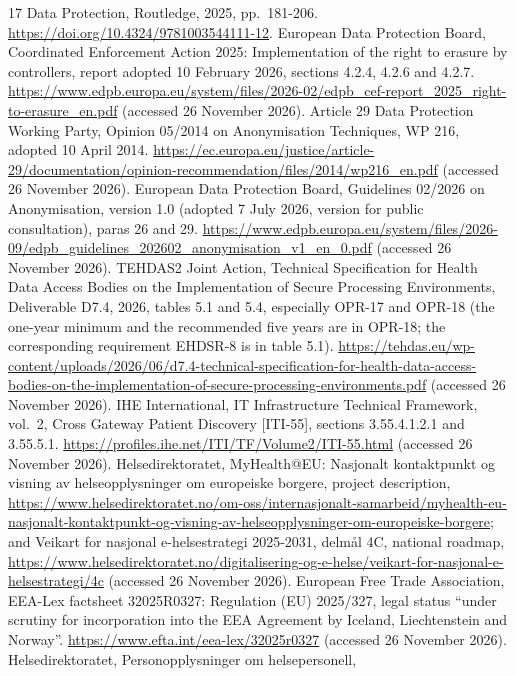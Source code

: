 \documentclass[5p,twocolumn]{elsarticle}
\begin{document}
\begin{thebibliography}{17}
Data Protection, Routledge, 2025, pp.~181-206.
\url{https://doi.org/10.4324/9781003544111-12}.
 European Data Protection Board, Coordinated Enforcement Action
2025: Implementation of the right to erasure by controllers, report
adopted 10 February 2026, sections 4.2.4, 4.2.6 and 4.2.7.
\url{https://www.edpb.europa.eu/system/files/2026-02/edpb_cef-report_2025_right-to-erasure_en.pdf}
(accessed 26 November 2026).
 Article 29 Data Protection Working Party, Opinion 05/2014 on
Anonymisation Techniques, WP 216, adopted 10 April 2014.
\url{https://ec.europa.eu/justice/article-29/documentation/opinion-recommendation/files/2014/wp216_en.pdf}
(accessed 26 November 2026).
 European Data Protection Board, Guidelines 02/2026 on
Anonymisation, version 1.0 (adopted 7 July 2026, version for public
consultation), paras 26 and 29.
\url{https://www.edpb.europa.eu/system/files/2026-09/edpb_guidelines_202602_anonymisation_v1_en_0.pdf}
(accessed 26 November 2026).
 TEHDAS2 Joint Action, Technical Specification for Health Data
Access Bodies on the Implementation of Secure Processing Environments,
Deliverable D7.4, 2026, tables 5.1 and 5.4, especially OPR-17 and OPR-18
(the one-year minimum and the recommended five years are in OPR-18; the
corresponding requirement EHDSR-8 is in table 5.1).
\url{https://tehdas.eu/wp-content/uploads/2026/06/d7.4-technical-specification-for-health-data-access-bodies-on-the-implementation-of-secure-processing-environments.pdf}
(accessed 26 November 2026).
 IHE International, IT Infrastructure Technical Framework,
vol.~2, Cross Gateway Patient Discovery {[}ITI-55{]}, sections
3.55.4.1.2.1 and 3.55.5.1.
\url{https://profiles.ihe.net/ITI/TF/Volume2/ITI-55.html} (accessed 26
November 2026).
 Helsedirektoratet, MyHealth@EU: Nasjonalt kontaktpunkt og
visning av helseopplysninger om europeiske borgere, project description,
\url{https://www.helsedirektoratet.no/om-oss/internasjonalt-samarbeid/myhealth-eu-nasjonalt-kontaktpunkt-og-visning-av-helseopplysninger-om-europeiske-borgere};
and Veikart for nasjonal e-helsestrategi 2025-2031, delmål 4C, national
roadmap,
\url{https://www.helsedirektoratet.no/digitalisering-og-e-helse/veikart-for-nasjonal-e-helsestrategi/4c}
(accessed 26 November 2026).
 European Free Trade Association, EEA-Lex factsheet 32025R0327:
Regulation (EU) 2025/327, legal status ``under scrutiny for
incorporation into the EEA Agreement by Iceland, Liechtenstein and
Norway''. \url{https://www.efta.int/eea-lex/32025r0327} (accessed 26
November 2026).
 Helsedirektoratet, Personopplysninger om helsepersonell,

\end{thebibliography}
\end{document}
